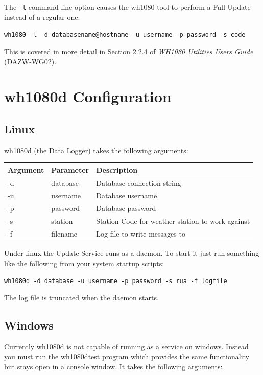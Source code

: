 \documentclass[a4paper,10pt,draft]{book}
\begin{document}
The \verb|-l| command-line option causes the wh1080 tool to perform a Full Update instead of a regular one:

\verb|wh1080 -l -d databasename@hostname -u username -p password -s code|

This is covered in more detail in Section 2.2.4 of \emph{WH1080 Utilities Users Guide} (DAZW-WG02).

\section{wh1080d Configuration}
\subsection{Linux}

wh1080d (the Data Logger) takes the following arguments:

\begin{tabular}{l l p{10cm}}
\hline
\textbf{Argument} & \textbf{Parameter} & \textbf{Description} \\
\hline
-d & database & Database connection string \\
-u & username & Database username \\
-p & password & Database password \\
-s & station  & Station Code for weather station to work against \\
-f & filename & Log file to write messages to \\
\hline
\end{tabular}

Under linux the Update Service runs as a daemon. To start it just run something like the following from your system startup scripts:

\verb|wh1080d -d database -u username -p password -s rua -f logfile|

The log file is truncated when the daemon starts.

\subsection{Windows}


Currently wh1080d is not capable of running as a service on windows. Instead you must run the wh1080dtest program which provides the same functionality but stays open in a console window. It takes the following arguments:
\end{document}
